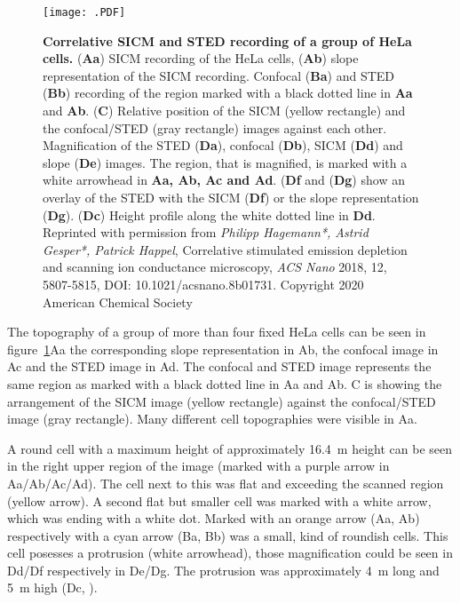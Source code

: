 \begin{figure}	
  \centering
    \texttt{[image: .PDF]} %
      \caption{
      \textbf{Correlative SICM and STED recording of a group of HeLa cells.} 
      (\textbf{Aa}) SICM recording of the HeLa cells, (\textbf{Ab}) slope representation of the
      SICM recording. Confocal (\textbf{Ba}) and STED (\textbf{Bb}) recording of the region marked 
      with a black dotted line in \textbf{Aa} and \textbf{Ab}. (\textbf{C}) Relative position of 
      the SICM (yellow rectangle) and the confocal/STED (gray rectangle) images against each 
      other. Magnification of the STED (\textbf{Da}), confocal (\textbf{Db}), SICM (\textbf{Dd}) 
      and slope (\textbf{De}) images. The region, that is magnified, is marked with a white 
      arrowhead in \textbf{Aa, Ab, Ac and Ad}. (\textbf{Df} and (\textbf{Dg}) show an overlay of 
      the STED with the SICM (\textbf{Df}) or the slope representation (\textbf{Dg}). 
      (\textbf{Dc}) Height profile along the white dotted line in \textbf{Dd}. \newline Reprinted 
      with permission from \emph{Philipp Hagemann*, Astrid Gesper*, Patrick Happel}, Correlative 
      stimulated emission depletion and scanning ion conductance microscopy, \emph{ACS Nano} 2018, 
      12, 5807-5815, DOI: 10.1021/acsnano.8b01731. Copyright 2020 American Chemical Society}
  \label{fig:SICM_STED1}
\end{figure}

The topography of a group of more than four fixed HeLa cells can be seen in 
figure~\ref{fig:SICM_STED1}Aa the corresponding slope representation in Ab, the confocal image in 
Ac and the STED image in Ad. The confocal and STED image represents the same region as marked with 
a black dotted line in Aa and Ab. C is showing the arrangement of the SICM image (yellow 
rectangle) against the confocal/STED image (gray rectangle). Many different cell topographies were
visible in Aa. 

A round cell with a maximum height of approximately 16.4~{\textmu}m height can be seen in the 
right upper region of the image (marked with a purple arrow in Aa/Ab/Ac/Ad). The cell next to this 
was flat and exceeding the scanned region (yellow arrow). A second flat but smaller cell was 
marked with a white arrow, which was ending with a white dot. Marked with an orange arrow (Aa, Ab) 
respectively with a cyan arrow (Ba, Bb) was a small, kind of roundish cells. This cell posesses 
a protrusion (white arrowhead), those magnification could be seen in Dd/Df respectively in De/Dg. 
The protrusion was approximately 4~{\textmu}m long and 5~{\textmu}m high (Dc, 
\cite{Hagemann2018}).

